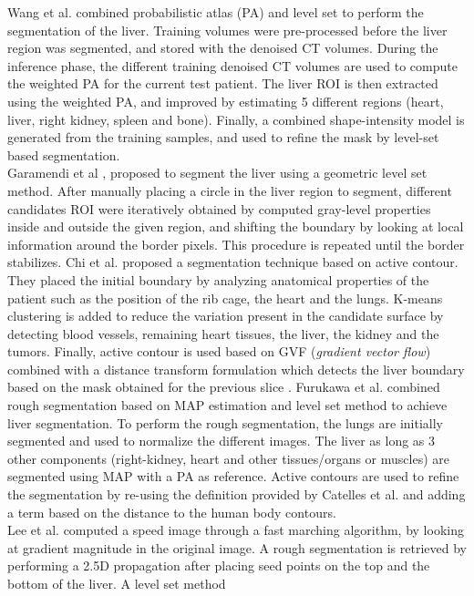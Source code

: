 Wang et al. \cite{Wang2016} combined probabilistic atlas (PA) and level set to perform the segmentation of the liver. Training volumes were pre-processed before the liver region was
segmented, and stored with the denoised CT volumes. During the inference
phase, the different training denoised CT volumes are used to compute
the weighted PA for the current test patient. The liver ROI is then
extracted using the weighted PA, and improved by estimating 5 different
regions (heart, liver, right kidney, spleen and bone). Finally, a
combined shape-intensity model is generated from the training samples,
and used to refine the mask by level-set based segmentation.\\
Garamendi et al \cite{Garamendi2007}, proposed to segment the liver using a
geometric level set method. After manually placing a circle in the liver
region to segment, different candidates ROI were iteratively obtained by
computed gray-level properties inside and outside the given region, and
shifting the boundary by looking at local information around the border
pixels. This procedure is repeated until the border stabilizes.
Chi et al. \cite{Chi2007} proposed a segmentation technique based on active
contour. They placed the initial boundary by analyzing anatomical
properties of the patient such as the position of the rib cage, the
heart and the lungs. K-means clustering is added to reduce the variation
present in the candidate surface by detecting blood vessels, remaining
heart tissues, the liver, the kidney and the tumors. Finally, active
contour is used based on GVF (\emph{gradient vector flow}) combined with
a distance transform formulation which detects the liver boundary based on
the mask obtained for the previous slice .
Furukawa et al. \cite{Furukawa2007} combined rough segmentation based on MAP estimation and
level set method to achieve liver segmentation. To perform the rough
segmentation, the lungs are initially segmented and used to normalize
the different images. The liver as long as 3 other components
(right-kidney, heart and other tissues/organs or muscles) are segmented
using MAP with a PA as reference. Active contours are used to refine the
segmentation by re-using the definition provided by Catelles et al. and
adding a term based on the distance to the human body contours.\\ 
Lee et al. \cite{Lee2007} computed a speed image through a fast marching algorithm, by
looking at gradient magnitude in the original image. A rough
segmentation is retrieved by performing a 2.5D propagation after placing
seed points on the top and the bottom of the liver. A level set method
